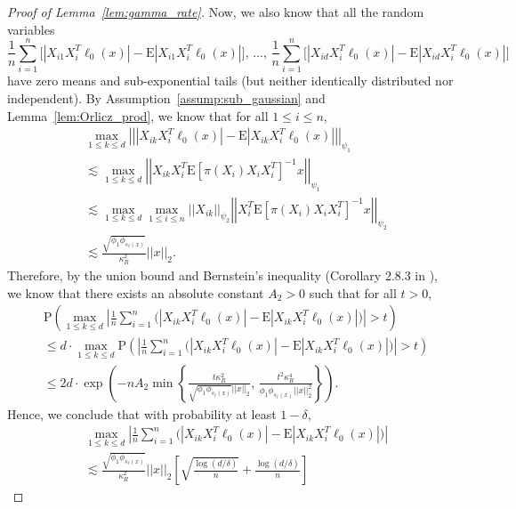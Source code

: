 \documentclass[ejsv2,noshowframe]{imsart}
\theoremstyle{plain}
\theoremstyle{definition}
\theoremstyle{remark}
\newcommand{\norm}[1]{\left|\left| #1 \right|\right|}
\begin{document}
\begin{proof}[Proof of Lemma~\ref{lem:gamma_rate}]
	Now, we also know that all the random variables 
	$$\frac{1}{n}\sum_{i=1}^n \Big[\left|X_{i1} X_i^T\ell_0(x) \right| -\mathrm{E}\left|X_{i1} X_i^T\ell_0(x) \right| \Big],\,...,\, \frac{1}{n}\sum_{i=1}^n \Big[\left|X_{id} X_i^T\ell_0(x) \right| -\mathrm{E}\left|X_{id} X_i^T\ell_0(x) \right| \Big]$$
	have zero means and sub-exponential tails (but neither identically distributed nor independent). By Assumption~\ref{assump:sub_gaussian} and Lemma~\ref{lem:Orlicz_prod}, we know that for all $1\leq i \leq n$,
	\begin{align*}
		&\max_{1\leq k \leq d} \norm{\left|X_{ik} X_i^T\ell_0(x) \right| -\mathrm{E}\left|X_{ik} X_i^T\ell_0(x) \right|}_{\psi_1}\\
		&\lesssim \max_{1\leq k \leq d} \norm{X_{ik} X_i^T \mathrm{E}\left[\pi(X_i)X_iX_i^T\right]^{-1} x}_{\psi_1}\\
		&\lesssim \max_{1\leq k \leq d} \max_{1\leq i \leq n}\norm{X_{ik}}_{\psi_2} \norm{X_i^T \mathrm{E}\left[\pi(X_i)X_iX_i^T\right]^{-1} x}_{\psi_2}\\
		&\lesssim \frac{\sqrt{\phi_1 \phi_{s_{\ell}(x)}}}{\kappa_R^2} \norm{x}_2.
	\end{align*}
	Therefore, by the union bound and Bernstein's inequality (Corollary 2.8.3 in \citealt{vershynin2018high}), we know that there exists an absolute constant $A_2>0$ such that for all $t>0$, 
	\begin{align*}
		&\mathrm{P}\left(\max_{1\leq k \leq d}\left|\frac{1}{n}\sum_{i=1}^n \Big(\left|X_{ik} X_i^T\ell_0(x) \right| -\mathrm{E}\left|X_{ik} X_i^T\ell_0(x) \right| \Big) \right| > t \right) \\
		& \leq d \cdot \max_{1\leq k \leq d} \mathrm{P}\left(\left|\frac{1}{n}\sum_{i=1}^n \Big(\left|X_{ik} X_i^T\ell_0(x) \right| -\mathrm{E}\left|X_{ik} X_i^T\ell_0(x) \right| \Big) \right| >t \right)\\
		&\leq 2d \cdot \exp\left(-nA_2\min\left\{\frac{t\kappa_R^2}{\sqrt{\phi_1 \phi_{s_{\ell}(x)}}\norm{x}_2},\, \frac{t^2\kappa_R^4}{\phi_1 \phi_{s_{\ell}(x)}\norm{x}_2^2} \right\} \right).
	\end{align*}
	Hence, we conclude that with probability at least $1-\delta$,
	\begin{align*}
		&\max_{1\leq k \leq d}\left|\frac{1}{n}\sum_{i=1}^n \Big(\left|X_{ik} X_i^T\ell_0(x) \right| -\mathrm{E}\left|X_{ik} X_i^T\ell_0(x) \right| \Big) \right| \\
		&\lesssim \frac{\sqrt{\phi_1 \phi_{s_{\ell}(x)}}}{\kappa_R^2}\norm{x}_2 \left[\sqrt{\frac{\log(d/\delta)}{n}} + \frac{\log(d/\delta)}{n} \right]

\end{align*}
\end{proof}
\end{document}

